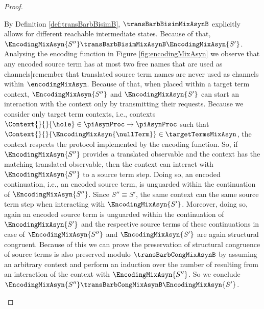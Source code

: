 \documentclass[]{llncs}
\begin{document}
\begin{proof}
\begin{description}
\begin{description}
				By Definition \ref{def:transBarbBisimB}, $ \transBarbBisimMixAsynB $ explicitly allows for different reachable intermediate states. Because of that, $ \EncodingMixAsyn{S''} \transBarbBisimMixAsynB \EncodingMixAsyn{S'} $. Analysing the encoding function in Figure \ref{fig:encodingMixAsyn} we observe that any encoded source term has at most two free names that are used as channels|remember that translated source term names are never used as channels within $ \encodingMixAsyn $. Because of that, when placed within a target term context, $ \EncodingMixAsyn{S''} $ and $ \EncodingMixAsyn{S'} $ can start an interaction with the context only by transmitting their requests. Because we consider only target term contexts, i.e., contexts $ \Context{}{}{\hole} \in \piAsynProc \to \piAsynProc $ such that $ \Context{}{}{\EncodingMixAsyn{\nullTerm}} \in \targetTermsMixAsyn $, the context respects the protocol implemented by the encoding function. So, if $ \EncodingMixAsyn{S''} $ provides a translated observable and the context has the matching translated observable, then the context can interact with $ \EncodingMixAsyn{S''} $ to \simulate a source term step. Doing so, an encoded continuation, i.e., an encoded source term, is unguarded within the continuation of $ \EncodingMixAsyn{S''} $. Since $ S'' \equiv S' $, the same context can \simulate the same source term step when interacting with $ \EncodingMixAsyn{S'} $. Moreover, doing so, again an encoded source term is unguarded within the continuation of $ \EncodingMixAsyn{S'} $ and the respective source terms of these continuations in case of $ \EncodingMixAsyn{S''} $ and $ \EncodingMixAsyn{S'} $ are again structural congruent. Because of this we can prove the preservation of structural congruence of source terms is also preserved modulo $ \transBarbCongMixAsynB $ by assuming an arbitrary context and perform an induction over the number of \simulations resulting from an interaction of the context with $ \EncodingMixAsyn{S''} $. So we conclude $ \EncodingMixAsyn{S''} \transBarbCongMixAsynB \EncodingMixAsyn{S'} $.
				

\end{description}
\end{description}
\end{proof}
\end{document}

